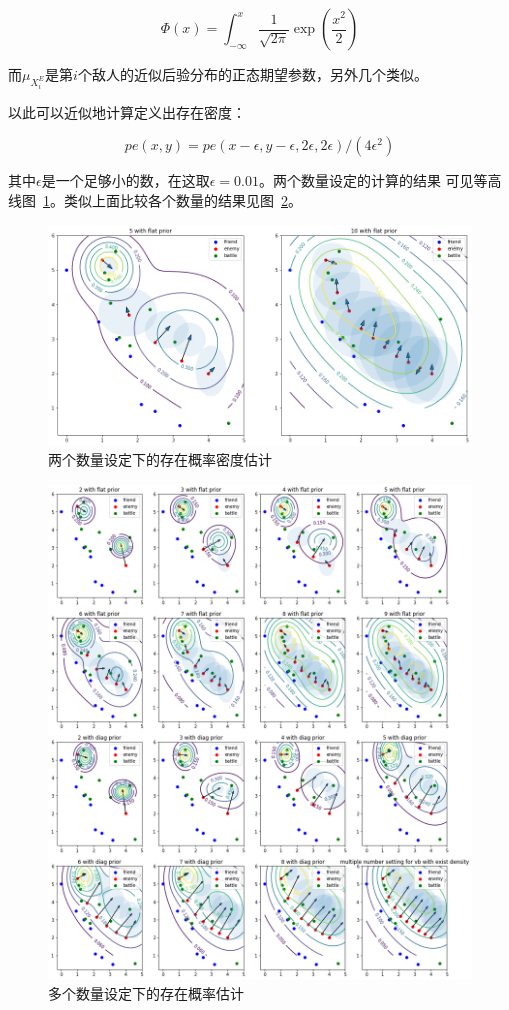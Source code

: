 \documentclass{article}
\begin{document}
$$
\Phi(x) = \int_{-\infty}^x \frac{1}{\sqrt{2\pi}} \exp\left(\frac{x^2}{2}\right)
$$


而$\mu_{X^E_i}$是第$i$个敌人的近似后验分布的正态期望参数，另外几个类似。

以此可以近似地计算定义出存在密度：

$$
pe(x,y) = pe(x-\epsilon,y-\epsilon,2\epsilon,2\epsilon)/(4 \epsilon^2)
$$


其中$\epsilon$是一个足够小的数，在这取$\epsilon=0.01$。两个数量设定的计算的结果
可见等高线图~\ref{fig:existDensity}。类似上面比较各个数量的结果见图~\ref{fig:bigVbExist}。

\begin{figure}[ht]
\includegraphics[width=0.99\linewidth]{exist_density.png}
\caption{两个数量设定下的存在概率密度估计}
\label{fig:existDensity}
\end{figure}


\begin{figure}[ht]
\includegraphics[width=0.99\linewidth]{big_vb_exist_prob.png}
\caption{多个数量设定下的存在概率估计}
\label{fig:bigVbExist}
\end{figure}
\end{document}
